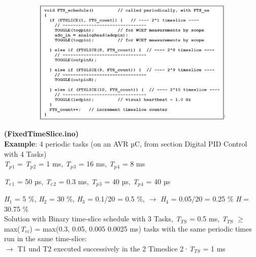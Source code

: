 	\begin{figure}[h]
    \centering
    \includegraphics[width=13cm, height=6cm]{Images/image95.png}
    \label{fig:Fig }
    \end{figure}

\textbf{  (FixedTimeSlice.ino)}\\

\textbf{Example}: 4 periodic tasks (on an AVR µC, from section Digital PID Control with 4 Tasks) \\

\textit{T${}_{p}$}${}_{1}$ = \textit{T${}_{p}$}${}_{2}$ = 1 ms, \textit{T${}_{p}$}${}_{3}$ = 16 ms, \textit{T${}_{p}$}${}_{4}$ = 8 ms

\textit{T${}_{e}$}${}_{1}$ = 50 µs, \textit{T${}_{e}$}${}_{2}$ = 0.3 ms, \textit{T${}_{p}$}${}_{3}$ = 40 µs, \textit{T${}_{p}$}${}_{4}$ = 40 µs

\textit{H}${}_{1}$ = 5 \%, \textit{H}${}_{2}$ = 30 \%, \textit{H}${}_{3}$ = 0.1/20 = 0.5 \%, $\rightarrow$ \textit{H}${}_{4}$ = 0.05/20 = 0.25 \%  \textit{H} = 30.75 \%\\

Solution with Binary time-slice schedule with 3 Tasks, \textit{T${}_{TS}$} = 0.5 ms, \textit{T${}_{TS}$} $\mathrm{\ge}$ max(\textit{T${}_{ei}$}) = max(0.3, 0.05, 0.005 0.0025 ms) tasks with the same periodic times run in the same time-slice:\\
 $\rightarrow$ T1 und T2 executed successively in the 2 Timeslice 2·\textit{T${}_{TS}$ }= 1 ms\\
 
